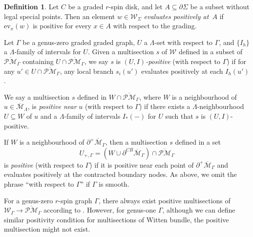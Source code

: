 \documentclass[11pt]{amsart}
\theoremstyle{definition}
\newtheorem{definition}[dummy]{Definition}
\theoremstyle{remark}
\newcommand{\oPMb}{{\overline{\mathcal{PM}}}}
\newcommand{\<}{\left<}
\renewcommand{\>}{\right>}
\numberwithin{equation}{section}
\def\Mbar{{\overline{\mathcal M}}}
\def\ev{\text{ev}}
\begin{document}
\begin{definition}\label{def positive section}
Let $C$ be a graded $r$-spin disk, and let $A \subseteq \partial\Sigma$ be a subset without legal special points.  Then an element $w\in{\mathcal{W}}_\Sigma$ \emph{evaluates positively at~$A$} if $\ev_x(w)$ is positive for every $x\in A$ with respect to the grading.

Let $\Gamma$ be a genus-zero graded graded graph, $U$ a $\Lambda$-set with respect to $\Gamma$, and $\{I_h\}$ a $\Lambda$-family of intervals for $U$.  Given a multisection $s$ of ${\mathcal{W}}$ defined in a subset of $\oPMb_\Gamma$ containing $U\cap\oPMb_\Gamma$, we say $s$ is \emph{$(U,I)$-positive} (with respect to $\Gamma$) if for any $u'\in U\cap \oPMb_\Gamma$, any local branch $s_i(u')$ evaluates positively at each $I_h(u')$.

We say a multisection $s$ defined in $W\cap\oPMb_\Gamma$, where $W$ is a neighbourhood of $u\in\Mbar_\Lambda$, is \emph{positive near} $u$ (with respect to $\Gamma$) if there exists a $\Lambda$-neighbourhood $U\subseteq W$ of $u$ and a $\Lambda$-family of intervals $I_*(-)$ for $U$ such that $s$ is $(U,I)$-positive.

If $W$ is a neighbourhood of $\partial^+\Mbar_\Gamma$, then a multisection $s$ defined in a set
\begin{equation}\label{eq U_+}
U_{+,\Gamma}=\left(W\cup \partial^{CB}\Mbar_{\Gamma}\right)\cap\oPMb_\Gamma
\end{equation}
is \emph{positive} (with respect to $\Gamma$) if it is positive near each point of $\partial^+\Mbar_\Gamma$ and evaluates positively at the contracted boundary nodes.  As above, we omit the phrase ``with respect to $\Gamma$'' if $\Gamma$ is smooth.
\end{definition}

For a genus-zero $r$-spin graph $\Gamma$, there always exist positive multisections of $\mathcal W_{\Gamma}\to \oPMb_{\Gamma}$ according to \cite[Proposition 3.20]{BCT2}. However, for genus-one $\Gamma$, although we can define similar positivity condition for multisections of Witten bundle, the positive multisection might not exist.
\end{document}
